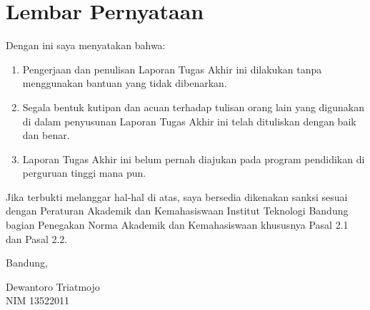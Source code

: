 \chapter*{Lembar Pernyataan}

Dengan ini saya menyatakan bahwa:

\begin{enumerate}

  \item Pengerjaan dan penulisan Laporan Tugas Akhir ini dilakukan tanpa menggunakan bantuan yang tidak dibenarkan.
  \item Segala bentuk kutipan dan acuan terhadap tulisan orang lain yang digunakan di dalam penyusunan Laporan Tugas Akhir ini telah dituliskan dengan baik dan benar.
  \item Laporan Tugas Akhir ini belum pernah diajukan pada program pendidikan di perguruan tinggi mana pun.

\end{enumerate}

Jika terbukti melanggar hal-hal di atas, saya bersedia dikenakan sanksi sesuai dengan Peraturan Akademik dan Kemahasiswaan Institut Teknologi Bandung bagian Penegakan Norma Akademik dan Kemahasiswaan khususnya Pasal 2.1 dan Pasal 2.2.
\vspace{15mm}

Bandung, \tanggalpengesahan

\vspace{1.5cm}
Dewantoro Triatmojo \\
NIM 13522011
